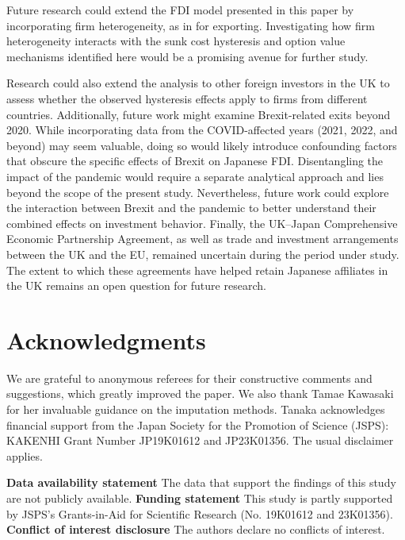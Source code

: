 \documentclass[preprint,11pt,authoryear]{elsarticle}
\begin{document}
Future research could extend the FDI model presented in this paper by incorporating firm heterogeneity, as in \citet{graziano2021brexit} for exporting. Investigating how firm heterogeneity interacts with the sunk cost hysteresis and option value mechanisms identified here would be a promising avenue for further study.

Research could also extend the analysis to other foreign investors in the UK to assess whether the observed hysteresis effects apply to firms from different countries. Additionally, future work might examine Brexit-related exits beyond 2020. While incorporating data from the COVID-affected years (2021, 2022, and beyond) may seem valuable, doing so would likely introduce confounding factors that obscure the specific effects of Brexit on Japanese FDI. Disentangling the impact of the pandemic would require a separate analytical approach and lies beyond the scope of the present study. Nevertheless, future work could explore the interaction between Brexit and the pandemic to better understand their combined effects on investment behavior.
Finally, the UK–Japan Comprehensive Economic Partnership Agreement, as well as trade and investment arrangements between the UK and the EU, remained uncertain during the period under study. The extent to which these agreements have helped retain Japanese affiliates in the UK remains an open question for future research.

\section*{Acknowledgments}
\noindent We are grateful to anonymous referees for their constructive comments and suggestions, which greatly improved the paper.
We also thank Tamae Kawasaki for her invaluable guidance on the imputation methods.
Tanaka acknowledges financial support from the Japan Society for the Promotion of Science (JSPS): KAKENHI Grant Number JP19K01612 and JP23K01356. The usual disclaimer applies.

\vspace{0.5cm}
\noindent
\textbf{Data availability statement}
The data that support the findings of this study are not publicly available. 
\newline
\textbf{Funding statement}
This study is partly supported by JSPS’s Grants-in-Aid for Scientific Research (No. 19K01612 and 23K01356).
\newline
\textbf{Conflict of interest disclosure}
The authors declare no conflicts of interest.
\end{document}
